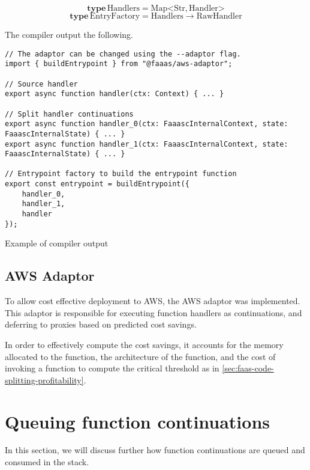 \begin{signature}
$$\textbf{type}\, \textrm{Handlers} = \textrm{Map}\mathord{<}\textrm{Str}, \textrm{Handler}\mathord{>}$$
$$\textbf{type}\, \textrm{EntryFactory} = \textrm{Handlers} \rightarrow \textrm{RawHandler}$$
\end{signature}

The \faaasc{} compiler output the following.

\begin{listing}[H]
\begin{verbatim}
// The adaptor can be changed using the --adaptor flag.
import { buildEntrypoint } from "@faaas/aws-adaptor";

// Source handler
export async function handler(ctx: Context) { ... }

// Split handler continuations
export async function handler_0(ctx: FaaascInternalContext, state: FaaascInternalState) { ... }
export async function handler_1(ctx: FaaascInternalContext, state: FaaascInternalState) { ... }

// Entrypoint factory to build the entrypoint function
export const entrypoint = buildEntrypoint({
    handler_0,
    handler_1,
    handler
});
\end{verbatim}
\caption{Example of \faaasc{} compiler output}
\label{listing:faaasc-compiler-adaptor-output}
\end{listing}

\subsection{AWS Adaptor}
To allow cost effective deployment to AWS, the \faaasc{} AWS adaptor was implemented. This adaptor is responsible for executing function handlers as continuations, and deferring to proxies based on predicted cost savings.

In order to effectively compute the cost savings, it accounts for the memory allocated to the function, the architecture of the function, and the cost of invoking a function to compute the critical threshold as in \ref{sec:faas-code-splitting-profitability}.

\section{Queuing function continuations}
In this section, we will discuss further how function continuations are queued and consumed in the \faaas{} stack.

